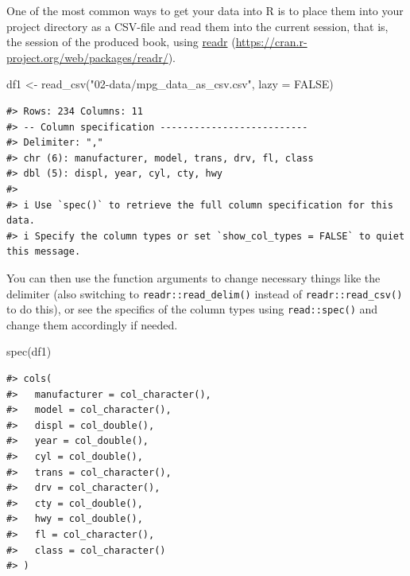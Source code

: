 \documentclass[
  11pt,
  a4paper,
  twoside]{scrbook}
\newenvironment{Shaded}{\begin{snugshade}}{\end{snugshade}}
\newcommand{\AttributeTok}[1]{\textcolor[rgb]{0.77,0.63,0.00}{#1}}
\newcommand{\ConstantTok}[1]{\textcolor[rgb]{0.00,0.00,0.00}{#1}}
\newcommand{\FunctionTok}[1]{\textcolor[rgb]{0.00,0.00,0.00}{#1}}
\newcommand{\NormalTok}[1]{#1}
\newcommand{\OtherTok}[1]{\textcolor[rgb]{0.56,0.35,0.01}{#1}}
\newcommand{\StringTok}[1]{\textcolor[rgb]{0.31,0.60,0.02}{#1}}
\begin{document}
One of the most common ways to get your data into R is to place them into your project directory as a CSV-file and read them into the current session, that is, the session of the produced book, using \href{https://cran.r-project.org/web/packages/readr/}{readr} (\url{https://cran.r-project.org/web/packages/readr/}).

\linespread{1}

\begin{Shaded}
\begin{Highlighting}[]
\NormalTok{df1 }\OtherTok{\textless{}{-}} \FunctionTok{read\_csv}\NormalTok{(}\StringTok{"02{-}data/mpg\_data\_as\_csv.csv"}\NormalTok{, }\AttributeTok{lazy =} \ConstantTok{FALSE}\NormalTok{)}
\end{Highlighting}
\end{Shaded}

\linespread{1}

\begin{verbatim}
#> Rows: 234 Columns: 11
#> -- Column specification --------------------------
#> Delimiter: ","
#> chr (6): manufacturer, model, trans, drv, fl, class
#> dbl (5): displ, year, cyl, cty, hwy
#> 
#> i Use `spec()` to retrieve the full column specification for this data.
#> i Specify the column types or set `show_col_types = FALSE` to quiet this message.
\end{verbatim}

You can then use the function arguments to change necessary things like the delimiter (also switching to \texttt{readr::read\_delim()} instead of \texttt{readr::read\_csv()} to do this), or see the specifics of the column types using \texttt{read::spec()} and change them accordingly if needed.

\linespread{1}

\begin{Shaded}
\begin{Highlighting}[]
\FunctionTok{spec}\NormalTok{(df1)}
\end{Highlighting}
\end{Shaded}

\linespread{1}

\begin{verbatim}
#> cols(
#>   manufacturer = col_character(),
#>   model = col_character(),
#>   displ = col_double(),
#>   year = col_double(),
#>   cyl = col_double(),
#>   trans = col_character(),
#>   drv = col_character(),
#>   cty = col_double(),
#>   hwy = col_double(),
#>   fl = col_character(),
#>   class = col_character()
#> )
\end{verbatim}
\end{document}
